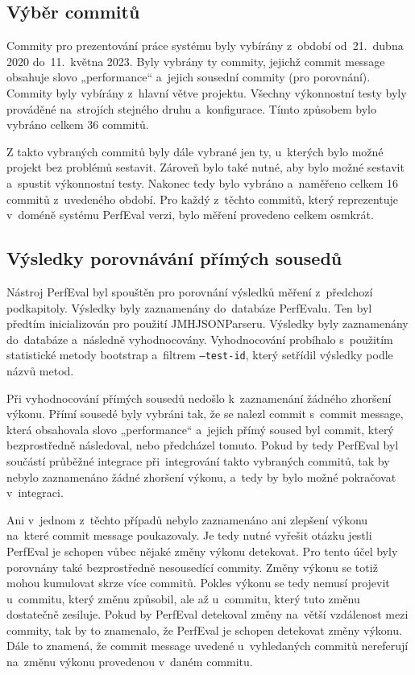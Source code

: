 \subsection{Výběr commitů}

Commity pro prezentování práce systému byly vybírány z~období od~21.~dubna 2020 do~11.~května 2023.
Byly vybrány ty commity, jejichž commit message obsahuje slovo „performance“ a~jejich sousední commity (pro porovnání).
Commity byly vybírány z~hlavní větve projektu. Všechny výkonnostní testy byly prováděné na~strojích stejného druhu a~konfigurace.
Tímto způsobem bylo vybráno celkem 36 commitů.

Z takto vybraných commitů byly dále vybrané jen ty, u~kterých bylo možné projekt bez problémů sestavit. Zároveň bylo také nutné,
aby bylo možné sestavit a~spustit výkonnostní testy. Nakonec tedy bylo vybráno a~naměřeno celkem 16 commitů z~uvedeného období.
Pro každý z~těchto commitů, který reprezentuje v~doméně systému PerfEval verzi, bylo měření provedeno celkem osmkrát.

\subsection{Výsledky porovnávání přímých sousedů}

Nástroj PerfEval byl spouštěn pro porovnání výsledků měření z~předchozí podkapitoly. Výsledky byly zaznamenány do~databáze PerfEvalu.
Ten byl předtím inicializován pro použití JMHJSONParseru. Výsledky byly zaznamenány do~databáze a~následně vyhodnocovány.
Vyhodnocování probíhalo s~použitím statistické metody bootstrap a~filtrem \texttt{--test-id}, který setřídil výsledky podle
názvů metod.

Při vyhodnocování přímých sousedů nedošlo k~zaznamenání žádného zhoršení výkonu. Přímí sousedé byly vybráni tak, že
se nalezl commit s~commit message, která obsahovala slovo „performance“ a~jejich přímý soused byl commit, který bezprostředně následoval, nebo předcházel tomuto.
Pokud by tedy PerfEval byl součástí průběžné integrace při~integrování takto vybraných commitů, tak by nebylo zaznamenáno žádné zhoršení výkonu,
a~tedy by bylo možné pokračovat v~integraci.

Ani v~jednom z~těchto případů nebylo zaznamenáno ani zlepšení výkonu na~které commit message poukazovaly.
Je tedy nutné vyřešit otázku jestli PerfEval je schopen vůbec nějaké změny výkonu detekovat.
Pro tento účel byly porovnány také bezprostředně nesousedící commity. Změny výkonu se totiž mohou kumulovat skrze více commitů.
Pokles výkonu se tedy nemusí projevit u~commitu, který změnu způsobil, ale až u~commitu, který tuto změnu dostatečně zesiluje.
Pokud by PerfEval detekoval změny na~větší vzdálenost mezi commity, tak by to znamenalo, že PerfEval je schopen detekovat změny výkonu.
Dále to znamená, že commit message uvedené u~vyhledaných commitů nereferují na~změnu výkonu provedenou v~daném commitu.

